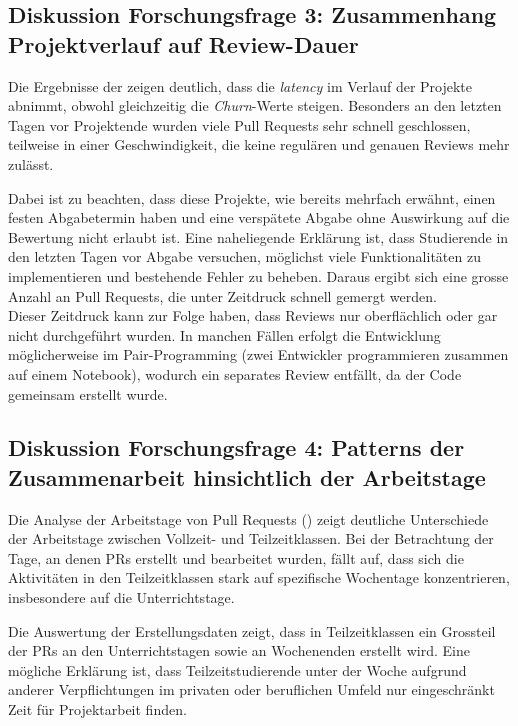\subsection{Diskussion Forschungsfrage 3: Zusammenhang Projektverlauf auf Review-Dauer}
Die Ergebnisse der  zeigen deutlich, dass die \textit{latency} im Verlauf der Projekte abnimmt, obwohl gleichzeitig die \textit{Churn}-Werte steigen. Besonders an den letzten Tagen vor Projektende wurden viele Pull Requests sehr schnell geschlossen, teilweise in einer Geschwindigkeit, die keine regulären und genauen Reviews mehr zulässt. 

Dabei ist zu beachten, dass diese Projekte, wie bereits mehrfach erwähnt, einen festen Abgabetermin haben und eine verspätete Abgabe ohne Auswirkung auf die Bewertung nicht erlaubt ist. Eine naheliegende Erklärung ist, dass Studierende in den letzten Tagen vor Abgabe versuchen, möglichst viele Funktionalitäten zu implementieren und bestehende Fehler zu beheben. Daraus ergibt sich eine grosse Anzahl an Pull Requests, die unter Zeitdruck schnell gemergt werden. \\
Dieser Zeitdruck kann zur Folge haben, dass Reviews nur oberflächlich oder gar nicht durchgeführt wurden. In manchen Fällen erfolgt die Entwicklung möglicherweise im Pair-Programming (zwei Entwickler programmieren zusammen auf einem Notebook), wodurch ein separates Review entfällt, da der Code gemeinsam erstellt wurde.

\subsection{Diskussion Forschungsfrage 4: Patterns der Zusammenarbeit hinsichtlich der Arbeitstage}
Die Analyse der Arbeitstage von Pull Requests () zeigt deutliche Unterschiede der Arbeitstage zwischen Vollzeit- und Teilzeitklassen. Bei der Betrachtung der Tage, an denen PRs erstellt und bearbeitet wurden, fällt auf, dass sich die Aktivitäten in den Teilzeitklassen stark auf spezifische Wochentage konzentrieren, insbesondere auf die Unterrichtstage. 

Die Auswertung der Erstellungsdaten zeigt, dass in Teilzeitklassen ein Grossteil der PRs an den Unterrichtstagen sowie an Wochenenden erstellt wird. Eine mögliche Erklärung ist, dass Teilzeitstudierende unter der Woche aufgrund anderer Verpflichtungen im privaten oder beruflichen Umfeld nur eingeschränkt Zeit für Projektarbeit finden.


